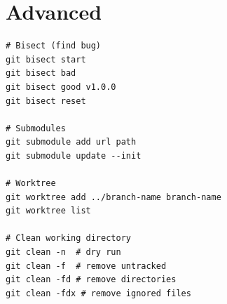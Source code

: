 \documentclass[12pt,a4paper]{article}
\begin{document}
\section{Advanced}
\begin{lstlisting}[style=bash]
# Bisect (find bug)
git bisect start
git bisect bad
git bisect good v1.0.0
git bisect reset

# Submodules
git submodule add url path
git submodule update --init

# Worktree
git worktree add ../branch-name branch-name
git worktree list

# Clean working directory
git clean -n  # dry run
git clean -f  # remove untracked
git clean -fd # remove directories
git clean -fdx # remove ignored files
\end{lstlisting}
\end{document}
